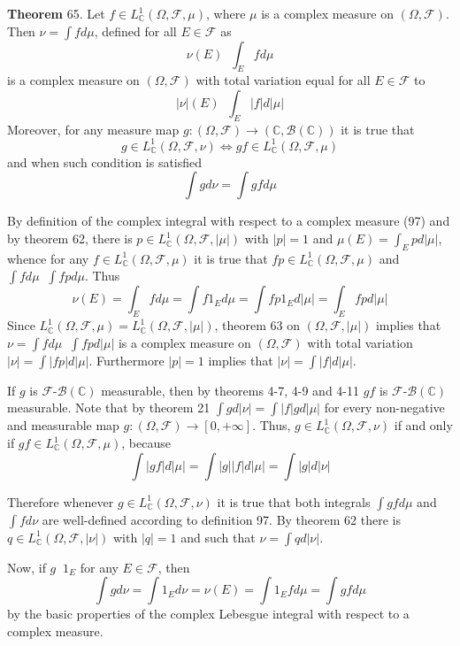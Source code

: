 \documentclass[a4paper]{article}
\newcommand{\clo}[1]{\left [ #1 \right ]}
\newcommand{\brac}[1]{\left ( #1 \right )}
\newcommand{\abs}[1]{\left | #1 \right |}
\newcommand{\Zinf}{\clo{ 0, +\infty }}
\newcommand{\Cplx}{\mathbb{C}}
\newcommand{\Fcal}{\mathcal{F}}
\newcommand{\borel}[1]{\mathcal{B}\brac{#1}}
\newcommand{\defn}{\mathop{\overset{\Delta}{=}}\nolimits}
\begin{document}
\label{thm:cplx_partial_int_meas} \noindent \textbf{Theorem} 65.
Let $f\in L^1_\Cplx\brac{\Omega, \Fcal, \mu}$, where $\mu$ is a complex measure on $\brac{\Omega, \Fcal}$. Then $\nu=\int f d\mu$, defined for all $E\in \Fcal$ as \[\nu\brac{E} \defn \int_E f d\mu\] is a complex measure on $\brac{\Omega, \Fcal}$ with total variation equal for all $E\in \Fcal$ to \[\abs{\nu}\brac{E}\defn \int_E \abs{f} d\abs{\mu}\] Moreover, for any measure map $g:\brac{\Omega, \Fcal}\to\brac{\Cplx, \borel{\Cplx}}$ it is true that \[g \in L^1_\Cplx\brac{\Omega, \Fcal, \nu} \Leftrightarrow gf \in L^1_\Cplx\brac{\Omega, \Fcal, \mu} \] and when such condition is satisfied \[\int g d\nu = \int gf d\mu\]

By definition of the complex integral with respect to a complex measure (97) and by theorem 62, there is $p\in L^1_\Cplx\brac{\Omega, \Fcal, \abs{\mu}}$ with $\abs{p}=1$ and $\mu\brac{E}=\int_E p d\abs{\mu}$, whence for any $f\in L^1_\Cplx\brac{\Omega, \Fcal, \mu}$ it is true that $f p\in L^1_\Cplx\brac{\Omega, \Fcal, \mu}$ and $\int fd\mu \defn \int f p d\mu$. Thus \[\nu\brac{E}=\int_E f d\mu = \int f 1_E d\mu = \int f p 1_E d\abs{\mu} = \int_E f p d\abs{\mu}\] Since $L^1_\Cplx\brac{\Omega, \Fcal, \mu}=L^1_\Cplx\brac{\Omega, \Fcal, \abs{\mu}}$, theorem 63 on $\brac{\Omega, \Fcal, \abs{\mu}}$ implies that $\nu = \int f d\mu \defn \int f p d\abs{\mu}$ is a complex measure on $\brac{\Omega, \Fcal}$ with total variation $\abs{\nu} = \int \abs{f p} d\abs{\mu}$. Furthermore $\abs{p}=1$ implies that $\abs{\nu} = \int \abs{f} d\abs{\mu}$.

If $g$ is $\Fcal$-$\borel{\Cplx}$ measurable, then by theorems 4-7, 4-9 and 4-11 $g f$ is $\Fcal$-$\borel{\Cplx}$ measurable. Note that by theorem 21 $\int g d\abs{\nu} = \int \abs{f} g d\abs{\mu}$ for every non-negative and measurable map $g:\brac{\Omega, \Fcal}\to\Zinf$. Thus, $g\in L^1_\Cplx\brac{\Omega, \Fcal, \nu}$ if and only if $g f\in L^1_\Cplx\brac{\Omega, \Fcal, \mu}$, because \[\int \abs{g f} d\abs{\mu} = \int \abs{g} \abs{f} d\abs{\mu} = \int \abs{g} d\abs{\nu}\]

Therefore whenever $g\in L^1_\Cplx\brac{\Omega,\Fcal,\nu}$ it is true that both integrals $\int g f d\mu$ and $\int f d\nu$ are well-defined according to definition 97. By theorem 62 there is $q\in L^1_\Cplx\brac{\Omega,\Fcal,\abs{\nu}}$ with $\abs{q}=1$ and such that $\nu = \int q d\abs{\nu}$.

Now, if $g \defn 1_E$ for any $E\in \Fcal$, then \[\int g d\nu = \int 1_E d\nu = \nu\brac{E} = \int 1_E f d\mu = \int g f d\mu\] by the basic properties of the complex Lebesgue integral with respect to a complex measure.
\end{document}
